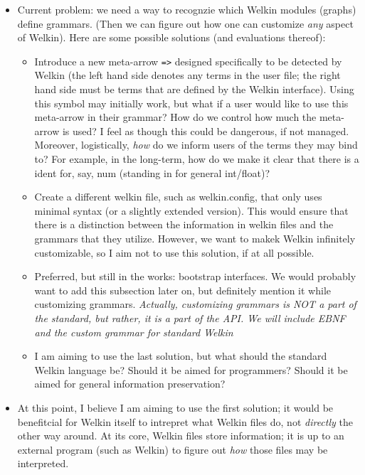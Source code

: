 \begin{itemize}
	\item Current problem: we need a way to recognzie which Welkin modules (graphs) define grammars. (Then we can figure out how one can customize \textit{any} aspect of Welkin). Here are some possible solutions (and evaluations thereof):
				\begin{itemize}
					\item Introduce a new meta-arrow \texttt{=>} designed specifically to be detected by Welkin (the left hand side denotes any terms in the user file; the right hand side must be terms that are defined by the Welkin interface). Using this symbol may initially work, but what if a user would like to use this meta-arrow in their grammar? How do we control how much the meta-arrow is used? I feel as though this could be dangerous, if not managed. Moreover, logistically, \textit{how} do we inform users of the terms they may bind to? For example, in the long-term, how do we make it clear that there is a ident for, say, num (standing in for general int/float)?
					\item Create a different welkin file, such as welkin.config, that only uses minimal syntax (or a slightly extended version). This would ensure that there is a distinction between the information in welkin files and the grammars that they utilize. However, we want to makek Welkin infinitely customizable, so I aim not to use this solution, if at all possible.
					\item Preferred, but still in the works: bootstrap interfaces. We would probably want to add this subsection later on, but definitely mention it while customizing grammars. \textit{Actually, customizing grammars is NOT a part of the standard, but rather, it is a part of the API. We will include EBNF and the custom grammar for standard Welkin}
				  \item I am aiming to use the last solution, but what should the standard Welkin language be? Should it be aimed for programmers? Should it be aimed for general information preservation?
				\end{itemize}
	\item At this point, I believe I am aiming to use the first solution; it would be benefitcial for Welkin itself to intrepret what Welkin files do, not \textit{directly} the other way around. At its core, Welkin files store information; it is up to an external program (such as Welkin) to figure out \textit{how} those files may be interpreted.
				\begin{itemize}

\end{itemize}
\end{itemize}
